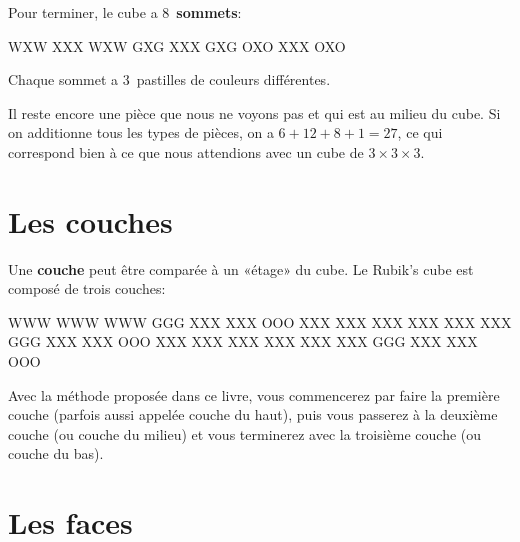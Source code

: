 Pour terminer, le cube a 8~\textbf{sommets}:

\begin{center}
	\RubikFaceUp%
	{W}{X}{W}%
	{X}{X}{X}%
	{W}{X}{W}
	\RubikFaceRight%
	{G}{X}{G}%
	{X}{X}{X}%
	{G}{X}{G}
	\RubikFaceFront%
	{O}{X}{O}%
	{X}{X}{X}%
	{O}{X}{O}
\end{center}

Chaque sommet a 3~pastilles de couleurs différentes.

Il reste encore une pièce que nous ne voyons pas et qui est au milieu du cube. Si on additionne tous les types de pièces, on a $6 + 12 + 8 + 1 = 27$, ce qui correspond bien à ce que nous attendions avec un cube de $3 \times 3 \times 3$.

\section{Les couches}
\begin{samepage}
Une \textbf{couche} peut être comparée à un «étage» du cube. Le Rubik's cube est composé de trois couches:

\begin{center}
	\RubikFaceUp%
	{W}{W}{W}%
	{W}{W}{W}%
	{W}{W}{W}
	\RubikFaceRight%
	{G}{G}{G}%
	{X}{X}{X}%
	{X}{X}{X}
	\RubikFaceFront%
	{O}{O}{O}%
	{X}{X}{X}%
	{X}{X}{X}
	\hspace*{5mm}
	\RubikFaceUp%
	{X}{X}{X}%
	{X}{X}{X}%
	{X}{X}{X}
	\RubikFaceRight%
	{X}{X}{X}%
	{G}{G}{G}%
	{X}{X}{X}
	\RubikFaceFront%
	{X}{X}{X}%
	{O}{O}{O}%
	{X}{X}{X}
	\hspace*{5mm}
	\RubikFaceUp%
	{X}{X}{X}%
	{X}{X}{X}%
	{X}{X}{X}
	\RubikFaceRight%
	{X}{X}{X}%
	{X}{X}{X}%
	{G}{G}{G}
	\RubikFaceFront%
	{X}{X}{X}%
	{X}{X}{X}%
	{O}{O}{O}
\end{center}
\end{samepage}
	
Avec la méthode proposée dans ce livre, vous commencerez par faire la première couche (parfois aussi appelée couche du haut), puis vous passerez à la deuxième couche (ou couche du milieu) et vous terminerez avec la troisième couche (ou couche du bas).

\section{Les faces}

